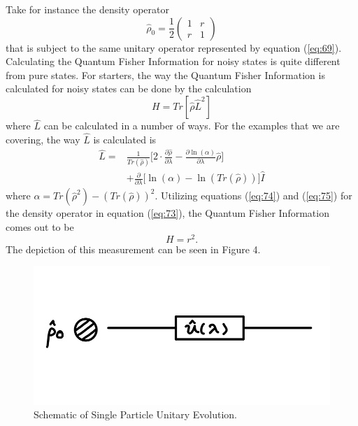 \documentclass[twocolumn]{article}
\begin{document}
Take for instance the density operator
\begin{equation} \label{eq:73}
\hat{\rho}_0=\frac{1}{2}
\begin{pmatrix}
1 & r \\
r & 1
\end{pmatrix}
\end{equation}
that is subject to the same unitary operator represented by equation (\ref{eq:69}). Calculating the Quantum Fisher Information for noisy states is quite different from pure states. For starters, the way the Quantum Fisher Information is calculated for noisy states can be done by the calculation
\begin{equation} \label{eq:74}
H=Tr[\hat{\rho}\hat{L}^2]
\end{equation}
where $\hat{L}$ can be calculated in a number of ways. For the examples that we are covering, the way $\hat{L}$ is calculated is
\begin{align} \label{eq:75}
\hat{L}=&\frac{1}{Tr(\hat{\rho})}\Big[2\cdot\frac{\partial\hat{\rho}}{\partial\lambda}-\frac{\partial \ln(\alpha)}{\partial\lambda}\hat{\rho}\Big] \nonumber \\
&+\frac{\partial}{\partial\lambda}\Big[\ln(\alpha)-\ln(Tr(\hat{\rho}))\Big]\hat{I}
\end{align}
\cite{D. Collins} where $\alpha=Tr{(\hat{\rho}^2)}-(Tr(\hat{\rho}))^2$. Utilizing equations (\ref{eq:74}) and (\ref{eq:75}) for the density operator in equation (\ref{eq:73}), the Quantum Fisher Information comes out to be 
\begin{equation} \label{eq:76}
H=r^2.
\end{equation}
The depiction of this measurement can be seen in Figure 4.
\begin{figure}[htpb]
\begin{center}
\includegraphics[width=0.90\linewidth]{Single-Particle-QFI.jpg}
\caption{Schematic of Single Particle Unitary Evolution.}
\end{center}
\end{figure}\newpage
\end{document}
